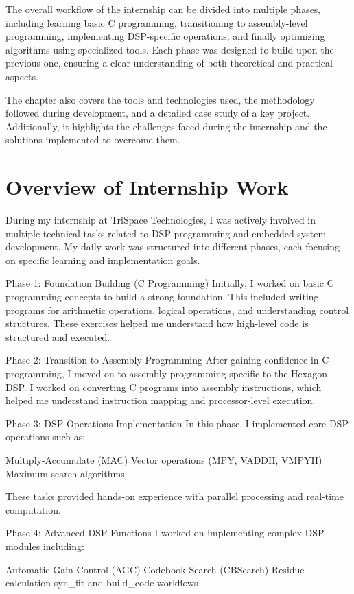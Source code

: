 \documentclass[12pt,a4paper]{report}
\begin{document}
The overall workflow of the internship can be divided into multiple phases, including learning basic C programming, transitioning to assembly-level programming, implementing DSP-specific operations, and finally optimizing algorithms using specialized tools. Each phase was designed to build upon the previous one, ensuring a clear understanding of both theoretical and practical aspects.


The chapter also covers the tools and technologies used, the methodology followed during development, and a detailed case study of a key project. Additionally, it highlights the challenges faced during the internship and the solutions implemented to overcome them.


\section{Overview of Internship Work}

During my internship at TriSpace Technologies, I was actively involved in multiple technical tasks related to DSP programming and embedded system development. My daily work was structured into different phases, each focusing on specific learning and implementation goals.


Phase 1: Foundation Building (C Programming) Initially, I worked on basic C programming concepts to build a strong foundation. This included writing programs for arithmetic operations, logical operations, and understanding control structures. These exercises helped me understand how high-level code is structured and executed.


Phase 2: Transition to Assembly Programming After gaining confidence in C programming, I moved on to assembly programming specific to the Hexagon DSP. I worked on converting C programs into assembly instructions, which helped me understand instruction mapping and processor-level execution.


Phase 3: DSP Operations Implementation In this phase, I implemented core DSP operations such as:


Multiply-Accumulate (MAC) Vector operations (MPY, VADDH, VMPYH) Maximum search algorithms


These tasks provided hands-on experience with parallel processing and real-time computation.


Phase 4: Advanced DSP Functions I worked on implementing complex DSP modules including:


Automatic Gain Control (AGC) Codebook Search (CBSearch) Residue calculation syn\_fit and build\_code workflows
\end{document}
